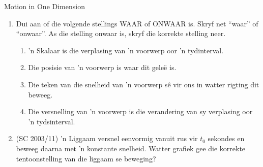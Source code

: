 \begin{eocexercises}{Motion in One Dimension}
\begin{enumerate}[noitemsep, label=\textbf{\arabic*}. ]
    \item Dui aan of die volgende stellings WAAR of ONWAAR is. Skryf net ``waar'' of ``onwaar''. As die stelling onwaar is, skryf die korrekte stelling neer.
    \begin{enumerate}[noitemsep, label=\textbf{\alph*}. ] 
        \item 'n Skalaar is die verplasing van 'n voorwerp oor 'n tydinterval.
        \item Die posisie van 'n voorwerp is waar dit gele\"e is.
        \item Die teken van die snelheid van 'n voorwerp s\^e vir ons in watter rigting dit beweeg.
        \item Die versnelling van 'n voorwerp is die verandering van sy verplasing oor 'n tydsinterval.
    \end{enumerate}
    
    \item (SC 2003/11) 'n Liggaam versnel eenvormig vanuit rus vir $t_0$ sekondes en beweeg daarna met 'n konstante snelheid. Watter grafiek gee die korrekte tentoonstelling van die liggaam se beweging?


\end{enumerate}
\end{eocexercises}
